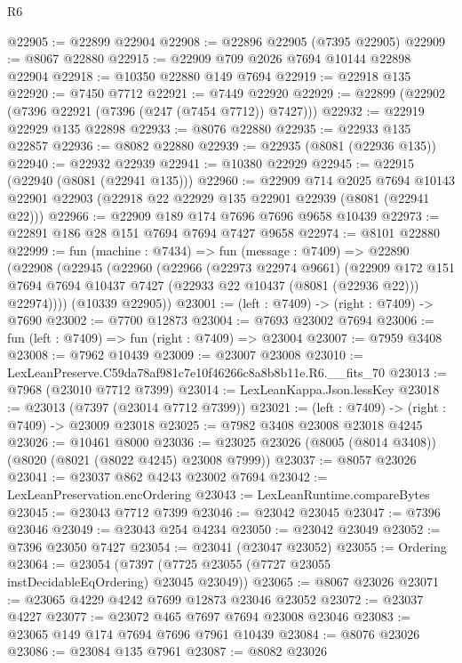 \begin{lexlean}{R6}
\begin{coremodule}
@22905 := @22899 @22904
@22908 := @22896 @22905 (@7395 @22905)
@22909 := @8067 @22880
@22915 := @22909 @709 @2026 @7694 @10144 @22898 @22904
@22918 := @10350 @22880 @149 @7694
@22919 := @22918 @135
@22920 := @7450 @7712
@22921 := @7449 @22920
@22929 := @22899 (@22902 (@7396 @22921 (@7396 (@247 (@7454 @7712)) @7427)))
@22932 := @22919 @22929 @135 @22898
@22933 := @8076 @22880
@22935 := @22933 @135 @22857
@22936 := @8082 @22880
@22939 := @22935 (@8081 (@22936 @135))
@22940 := @22932 @22939
@22941 := @10380 @22929
@22945 := @22915 (@22940 (@8081 (@22941 @135)))
@22960 := @22909
    @714
    @2025
    @7694
    @10143
    @22901
    @22903
    (@22918 @22 @22929 @135 @22901 @22939 (@8081 (@22941 @22)))
@22966 := @22909 @189 @174 @7696 @7696 @9658 @10439
@22973 := @22891 @186 @28 @151 @7694 @7694 @7427 @9658
@22974 := @8101 @22880
@22999 := fun (machine : @7434) =>
  fun (message : @7409) =>
  @22890
    (@22908
      (@22945
        (@22960
          (@22966
            (@22973 @22974 @9661)
            (@22909
              @172
              @151
              @7694
              @7694
              @10437
              @7427
              (@22933 @22 @10437 (@8081 (@22936 @22)))
              @22974))))
      (@10339 @22905))
@23001 := (left : @7409) -> (right : @7409) -> @7690
@23002 := @7700 @12873
@23004 := @7693 @23002 @7694
@23006 := fun (left : @7409) => fun (right : @7409) => @23004
@23007 := @7959 @3408
@23008 := @7962 @10439
@23009 := @23007 @23008
@23010 := LexLeanPreserve.C59da78af981c7e10f46266c8a8b8b11e.R6.__fits_70
@23013 := @7968 (@23010 @7712 @7399)
@23014 := LexLeanKappa.Json.lessKey
@23018 := @23013 (@7397 (@23014 @7712 @7399))
@23021 := (left : @7409) -> (right : @7409) -> @23009 @23018
@23025 := @7982 @3408 @23008 @23018 @4245
@23026 := @10461 @8000
@23036 := @23025 @23026 (@8005 (@8014 @3408)) (@8020 (@8021 (@8022 @4245) @23008 @7999))
@23037 := @8057 @23026
@23041 := @23037 @862 @4243 @23002 @7694
@23042 := LexLeanPreservation.encOrdering
@23043 := LexLeanRuntime.compareBytes
@23045 := @23043 @7712 @7399
@23046 := @23042 @23045
@23047 := @7396 @23046
@23049 := @23043 @254 @4234
@23050 := @23042 @23049
@23052 := @7396 @23050 @7427
@23054 := @23041 (@23047 @23052)
@23055 := Ordering
@23064 := @23054 (@7397 (@7725 @23055 (@7727 @23055 instDecidableEqOrdering) @23045 @23049))
@23065 := @8067 @23026
@23071 := @23065 @4229 @4242 @7699 @12873 @23046 @23052
@23072 := @23037 @4227
@23077 := @23072 @465 @7697 @7694 @23008 @23046
@23083 := @23065 @149 @174 @7694 @7696 @7961 @10439
@23084 := @8076 @23026
@23086 := @23084 @135 @7961
@23087 := @8082 @23026

\end{coremodule}
\end{lexlean}
